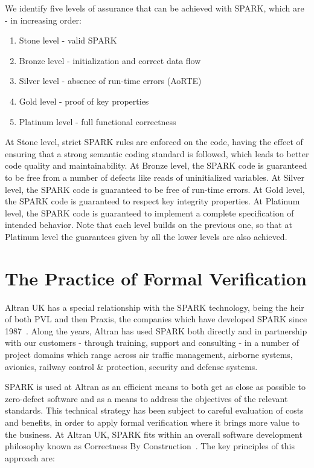 \documentclass{eceasst}
\begin{document}
We identify five levels of assurance that can be achieved with SPARK, which are
- in increasing order:

\begin{enumerate}
\item Stone level - valid SPARK
\item Bronze level - initialization and correct data flow
\item Silver level - absence of run-time errors (AoRTE)
\item Gold level - proof of key properties
\item Platinum level - full functional correctness
\end{enumerate}

At Stone level, strict SPARK rules are enforced on the code, having the effect
of ensuring that a strong semantic coding standard is followed, which leads to
better code quality and maintainability. At Bronze level, the SPARK code is
guaranteed to be free from a number of defects like reads of uninitialized
variables. At Silver level, the SPARK code is guaranteed to be free of run-time
errors. At Gold level, the SPARK code is guaranteed to respect key integrity
properties. At Platinum level, the SPARK code is guaranteed to implement a
complete specification of intended behavior. Note that each level builds on the
previous one, so that at Platinum level the guarantees given by all the lower
levels are also achieved.

\section{The Practice of Formal Verification}
\label{sec:practice}

Altran UK has a special relationship with the SPARK technology, being the heir
of both PVL and then Praxis, the companies which have developed SPARK since
1987~\cite{Chapman2014ITP}. Along the years, Altran has used SPARK both directly
and in partnership with our customers - through training, support and
consulting - in a number of project domains which range across air traffic
management, airborne systems, avionics, railway control \& protection, security
and defense systems.

SPARK is used at Altran as an efficient means to both get as close as possible
to zero-defect software and as a means to address the objectives of the
relevant standards. This technical strategy has been subject to careful
evaluation of costs and benefits, in order to apply formal verification where
it brings more value to the business. At Altran UK, SPARK fits within an
overall software development philosophy known as Correctness By
Construction~\cite{Croxford2005Manifesto}. The key principles of this approach
are:
\end{document}

